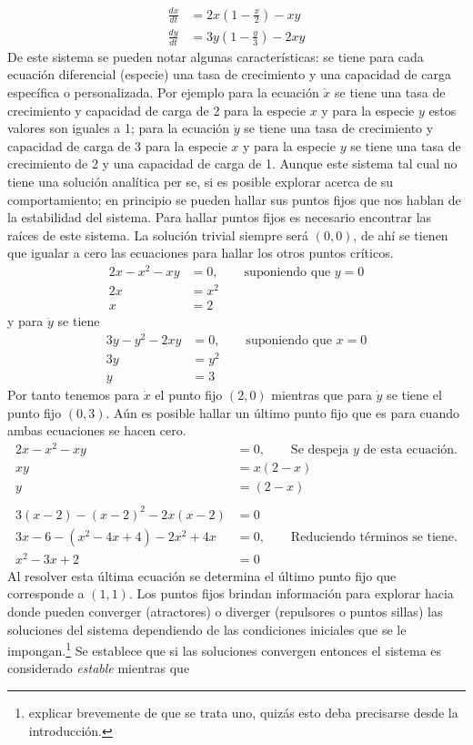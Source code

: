 \documentclass[11pt,a4paper]{article}
\begin{document}
\begin{align*}
	\frac{dx}{dt}&=2x\left(1-\frac{x}{2}\right)-xy\\
	\frac{dy}{dt}&=3y\left(1-\frac{y}{3}\right)-2xy
\end{align*}
De este sistema se pueden notar algunas características: se tiene para cada ecuación diferencial (especie) una tasa de crecimiento y una capacidad de carga específica o personalizada. Por ejemplo para la ecuación $\dot{x}$ se tiene una tasa de crecimiento y capacidad de carga de 2 para la especie $x$ y para la especie $y$ estos valores son iguales a 1; para la ecuación $\dot{y}$ se tiene una tasa de crecimiento y capacidad de carga de 3 para la especie $x$ y para la especie $y$ se tiene una tasa de crecimiento de 2 y una capacidad de carga de 1. Aunque este sistema tal cual no tiene una solución analítica per se, si es posible explorar acerca de su comportamiento; en principio se pueden hallar sus puntos fijos que nos hablan de la estabilidad del sistema. Para hallar puntos fijos es necesario encontrar las raíces de este sistema. La solución trivial siempre será $(0,0)$, de ahí se tienen que igualar a cero las ecuaciones para hallar los otros puntos críticos.
\begin{align*}
	2x-x^2-xy &= 0,\qquad\text{suponiendo que $y = 0$}\\
	2x &= x^2\\
	x&=2
\end{align*}
y para $\dot{y}$ se tiene
\begin{align*}
	3y-y^2-2xy&=0,\qquad\text{suponiendo que $x=0$}\\
	3y &= y^2\\
	y &= 3
\end{align*}
Por tanto tenemos para $\dot{x}$ el punto fijo $(2,0)$ mientras que para $\dot{y}$ se tiene el punto fijo $(0,3)$. Aún es posible hallar un último punto fijo que es para cuando ambas ecuaciones se hacen cero.
\begin{align*}
	2x-x^2-xy&=0,\qquad\text{Se despeja $y$ de esta ecuación.}\\
	xy &= x(2-x)\\
	y &= (2-x)\\
	\\
	3(x-2)-(x-2)^2-2x(x-2) &= 0\\
	3x-6-(x^2-4x+4)-2x^2+4x&=0,\qquad\text{Reduciendo términos se tiene.}\\
	x^2-3x+2 &= 0
\end{align*}
Al resolver esta última ecuación se determina el último punto fijo que corresponde a $(1,1)$. Los puntos fijos brindan información para explorar hacia donde pueden converger (atractores) o diverger (repulsores o puntos sillas) las soluciones del sistema dependiendo de las condiciones iniciales que se le impongan.\footnote{explicar brevemente de que se trata uno, quizás esto deba precisarse desde la introducción.} Se establece que si las soluciones convergen entonces el sistema es considerado \textit{estable} mientras que 
\end{document}
